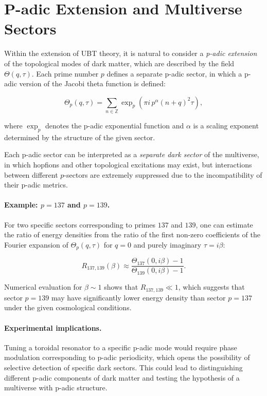 \section{P-adic Extension and Multiverse Sectors}

Within the extension of UBT theory, it is natural to consider a \emph{p-adic extension} of the topological modes
of dark matter, which are described by the field $\Theta(q,\tau)$. Each prime number $p$ defines a separate
p-adic sector, in which a p-adic version of the Jacobi theta function is defined:

\begin{equation}
\Theta_p(q,\tau) = \sum_{n \in \mathbb{Z}} \exp_p\!\left( \pi i\, p^\alpha (n+q)^2 \tau \right),
\end{equation}

where $\exp_p$ denotes the p-adic exponential function and $\alpha$ is a scaling exponent determined by
the structure of the given sector.

Each p-adic sector can be interpreted as a \emph{separate dark sector} of the multiverse,
in which hopfions and other topological excitations may exist, but interactions between different
$p$-sectors are extremely suppressed due to the incompatibility of their p-adic metrics.

\paragraph{Example: $p=137$ and $p=139$.}
For two specific sectors corresponding to primes $137$ and $139$, one can estimate the ratio
of energy densities from the ratio of the first non-zero coefficients of the Fourier expansion
of $\Theta_p(q,\tau)$ for $q=0$ and purely imaginary $\tau = i\beta$:

\begin{equation}
R_{137,139}(\beta) \approx \frac{\Theta_{137}(0,i\beta) - 1}{\Theta_{139}(0,i\beta) - 1}.
\end{equation}

Numerical evaluation for $\beta \sim 1$ shows that $R_{137,139} \ll 1$, which suggests
that sector $p=139$ may have significantly lower energy density than sector $p=137$
under the given cosmological conditions.

\paragraph{Experimental implications.}
Tuning a toroidal resonator to a specific p-adic mode would require phase modulation
corresponding to p-adic periodicity, which opens the possibility of selective detection of specific
dark sectors. This could lead to distinguishing different p-adic components of dark matter
and testing the hypothesis of a multiverse with p-adic structure.
